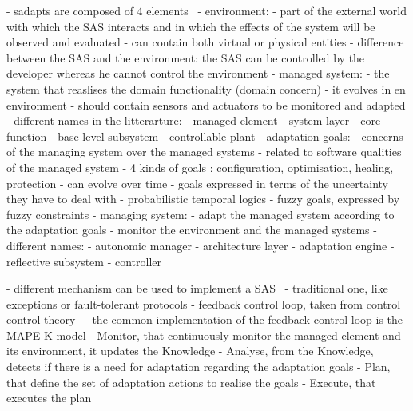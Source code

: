 - \glspl{sadapt} are composed of 4 elements~\cite{DBLP:books/sp/19/Weyns19}
	- environment:
    	- part of the external world with which the SAS interacts and in which the effects of the system will be observed and evaluated \cite{DBLP:journals/ansoft/Jackson97}
    	- can contain both virtual or physical entities
    	- difference between the SAS and the environment: the SAS can be controlled by the developer whereas he cannot control the environment
	- managed system:
    	- the system that reaslises the domain functionality (domain concern)
    	- it evolves in en environment
    	- should contain sensors and actuators to be monitored and adapted
    	- different names in the litterarture:
        	- managed element \cite{DBLP:journals/computer/KephartC03}
        	- system layer \cite{DBLP:journals/computer/GarlanCHSS04}
        	- core function \cite{DBLP:journals/taas/SalehieT09}
        	- base-level subsystem \cite{DBLP:journals/taas/WeynsMA12}
        	- controllable plant \cite{DBLP:conf/icse/FilieriHM14}
	- adaptation goals: 
    	- concerns of the managing system over the managed systems
    	- related to software qualities of the managed system \cite{DBLP:conf/ecsa/WeynsA13}
    	- 4 kinds of goals \cite{DBLP:journals/computer/KephartC03}: configuration, optimisation, healing, protection
    	- can evolve over time
    	- goals expressed in terms of the uncertainty they have to deal with
        	- probabilistic temporal logics \cite{DBLP:journals/tse/CalinescuGKMT11}
        	- fuzzy goals, expressed by fuzzy constraints \cite{DBLP:conf/re/BaresiPS10}
	- managing system:
    	- adapt the managed system according to the adaptation goals
    	- monitor the environment and the managed systems
    	- different names:
        	- autonomic manager \cite{DBLP:journals/computer/KephartC03}
        	- architecture layer \cite{DBLP:journals/computer/GarlanCHSS04}
        	- adaptation engine \cite{DBLP:journals/taas/SalehieT09}
        	- reflective subsystem \cite{DBLP:journals/taas/WeynsMA12}
        	- controller \cite{DBLP:conf/icse/FilieriHM14}

- different mechanism can be used to implement a SAS~\cite{DBLP:journals/computer/GarlanCHSS04}
	- traditional one, like exceptions or fault-tolerant protocols
	- feedback control loop, taken from control control theory~\cite{DBLP:conf/dagstuhl/BrunSGGKLMPS09}
- the common implementation of the feedback control loop is the MAPE-K model \cite{DBLP:journals/computer/KephartC03, computing2006architectural}
	- Monitor, that continuously monitor the managed element and its environment, it updates the Knowledge
    - Analyse, from the Knowledge, detects if there is a need for adaptation regarding the adaptation goals
    - Plan, that define the set of adaptation actions to realise the goals
    - Execute, that executes the plan

